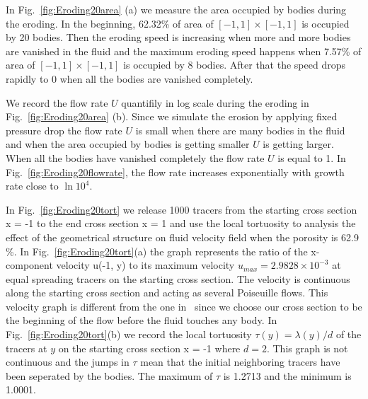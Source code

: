 \documentclass[preprint, 10pt]{elsarticle}
\begin{document}
{\color{red}
In Fig.~\ref{fig:Eroding20area} (a) we
measure the area occupied by bodies 
during the eroding. In the beginning, 62.32\% of area of $[-1,1] \times
[-1,1]$ is occupied by 20 bodies. Then the eroding speed is increasing
when more and more bodies are vanished in the fluid and 
the maximum eroding speed happens when 7.57\% of area of $[-1,1] \times
[-1,1]$ is occupied by 8 bodies. After that the speed drops rapidly to 0 when
all the bodies are vanished completely.

We record the flow rate $U$ quantifily in log scale
during the eroding in Fig.~\ref{fig:Eroding20area} (b). 
Since we simulate the erosion by applying fixed pressure drop 
the flow rate $U$ is small when there are many bodies in the fluid and 
when the area occupied by bodies is getting smaller $U$ is getting larger.
When all the bodies have vanished completely the flow rate $U$ is equal to 1.
In Fig.~\ref{fig:Eroding20flowrate}, the flow rate increases exponentially 
with growth rate close to $\ln10^4$. 


In Fig.~\ref{fig:Eroding20tort} we release 1000 tracers 
from the starting cross section x = -1 to 
the end cross section x = 1 and 
use the local tortuosity to analysis the effect
of the geometrical structure on fluid velocity field when the porosity is 62.9 \%.
In Fig.~\ref{fig:Eroding20tort}(a) the graph represents the ratio of the
x-component velocity u(-1, y) to its maximum velocity $u_{max}=2.9828
\times 10^{-3}$ at equal spreading tracers on the starting cross section.
The velocity is continuous along the starting cross section and
acting as several Poiseuille flows. This velocity graph is different
from the one in~\cite{matyka2008tortuosity} since we choose our cross
section to be the beginning of the flow before the fluid touches any
body. In Fig.~\ref{fig:Eroding20tort}(b) we record the local tortuosity
$\tau(y)=\lambda(y)/d$
of the tracers at $y$ on the starting cross section x = -1 
where $d = 2$.
This graph is not continuous 
and the jumps in $\tau$ mean that the initial neighboring tracers have been
seperated by the bodies. 
The maximum of $\tau$ is 1.2713 and the minimum is 1.0001.
}
\end{document}
